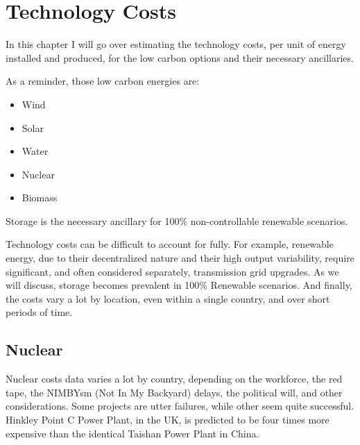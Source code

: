 \setchapterpreamble[u]{\margintoc}
\chapter{Technology Costs}

In this chapter I will go over estimating the technology costs, per unit of energy installed and produced, for the low carbon options and their necessary ancillaries. 

\begin{kaobox}[frametitle=Low Carbon Energies]
As a reminder, those low carbon energies are:

\begin{itemize}
	\item Wind
	\item Solar
	\item Water
	\item Nuclear
	\item Biomass
\end{itemize}

Storage is the necessary ancillary for 100\% non-controllable renewable scenarios.

\end{kaobox}


Technology costs can be difficult to account for fully. For example, renewable energy, due to their decentralized nature and their high output variability, require significant, and often considered separately, transmission grid upgrades. As we will discuss, storage becomes prevalent in 100\% Renewable scenarios. And finally, the costs vary a lot by location, even within a single country, and over short periods of time.

\section{Nuclear}

Nuclear costs data varies a lot by country, depending on the workforce, the red tape, the NIMBYsm (Not In My Backyard) delays, the political will, and other considerations. Some projects are utter failures, while other seem quite successful. Hinkley Point C Power Plant, in the UK, is predicted to be four times more expensive than the identical Taishan Power Plant in China.

